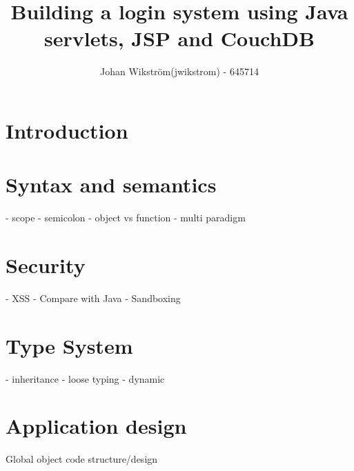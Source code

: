 \documentclass{report}
\title{Building a login system using Java servlets, JSP and CouchDB}
\author{Johan Wikström(jwikstrom) - 645714\\
}
\begin{document}
\maketitle
\tableofcontents
\section{Introduction}
\section{Syntax and semantics}
	- scope
	- semicolon
	- object vs function
	- multi paradigm
\section{Security}
	- XSS
	- Compare with Java
	- Sandboxing
	
\section{Type System}
	- inheritance
	- loose typing
	- dynamic
\section{Application design}
	Global object
	code structure/design
\end{document}
